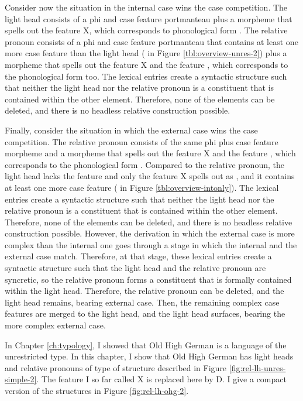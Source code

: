 Consider now the situation in the internal case wins the case competition. The light head consists of a phi and case feature portmanteau plus a morpheme that spells out the feature X, which corresponds to phonological form . The relative pronoun consists of a phi and case feature portmanteau that contains at least one more case feature than the light head ( in Figure \ref{tbl:overview-unres-2}) plus a morpheme that spells out the feature X and the feature , which corresponds to the phonological form  too.
The lexical entries create a syntactic structure such that neither the light head nor the relative pronoun is a constituent that is contained within the other element. Therefore, none of the elements can be deleted, and there is no headless relative construction possible.

Finally, consider the situation in which the external case wins the case competition. The relative pronoun consists of the same phi plus case feature morpheme and a morpheme that spells out the feature X and the feature , which corresponds to the phonological form . Compared to the relative pronoun, the light head lacks the feature  and only the feature X spells out as , and it contains at least one more case feature ( in Figure \ref{tbl:overview-intonly}). The lexical entries create a syntactic structure such that neither the light head nor the relative pronoun is a constituent that is contained within the other element. Therefore, none of the elements can be deleted, and there is no headless relative construction possible.
However, the derivation in which the external case is more complex than the internal one goes through a stage in which the internal and the external case match. Therefore, at that stage, these lexical entries create a syntactic structure such that the light head and the relative pronoun are syncretic, so the relative pronoun forms a constituent that is formally contained within the light head. Therefore, the relative pronoun can be deleted, and the light head remains, bearing external case. Then, the remaining complex case features are merged to the light head, and the light head surfaces, bearing the more complex external case.

In Chapter \ref{ch:typology}, I showed that Old High German is a language of the unrestricted type. In this chapter, I show that Old High German has light heads and relative pronouns of type of structure described in Figure \ref{fig:rel-lh-unres-simple-2}. The feature I so far called X is replaced here by D. I give a compact version of the structures in Figure \ref{fig:rel-lh-ohg-2}.

